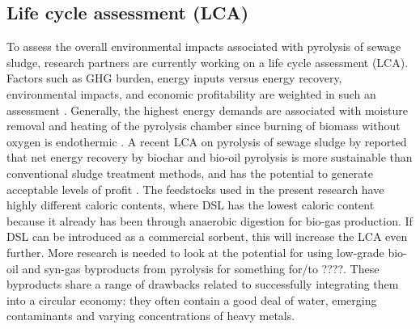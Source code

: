 \subsection{Life cycle assessment (LCA) \label{sec:LCA}}
To assess the overall environmental impacts associated with pyrolysis of sewage sludge, research partners are currently working on a life cycle assessment (LCA). Factors such as GHG burden, energy inputs versus energy recovery, environmental impacts, and economic profitability are weighted in such an assessment \citep{huang2022comparative}. Generally, the highest energy demands are associated with moisture removal and heating of the pyrolysis chamber since burning of biomass without oxygen is endothermic \citep{mcnamara2016pyrolysis}. A recent LCA on pyrolysis of sewage sludge by \citep{huang2022comparative} reported that net energy recovery by biochar and bio-oil pyrolysis is more sustainable than conventional sludge treatment methods, and has the potential to generate acceptable levels of profit \cite{huang2022comparative}. The feedstocks used in the present research have highly different caloric contents, where DSL has the lowest caloric content because it already has been through anaerobic digestion for bio-gas production. If DSL can be introduced as a commercial sorbent, this will increase the LCA even further. More research is needed to look at the potential for using low-grade bio-oil and syn-gas byproducts from pyrolysis for something for/to ????. These byproducts share a range of drawbacks related to successfully integrating them into a circular economy: they often contain a good deal of water, emerging contaminants and varying concentrations of heavy metals.  


